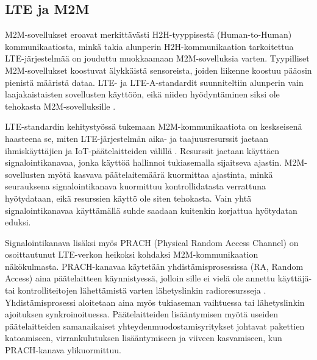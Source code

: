 \documentclass[finnish,12pt,a4paper,pdftex]{article}
\begin{document}
\subsection{LTE ja M2M}

M2M-sovellukset eroavat merkittävästi H2H-tyyppisestä (Human-to-Human) kommunikaatiosta, minkä takia alunperin H2H-kommunikaation tarkoitettua LTE-järjestelmää on jouduttu muokkaamaan M2M-sovelluksia varten. Tyypilliset M2M-sovellukset koostuvat älykkäistä sensoreista, joiden liikenne koostuu pääosin pienistä määristä dataa. LTE- ja LTE-A-standardit suunniteltiin alunperin vain laajakaistaisten sovellusten käyttöön, eikä niiden hyödyntäminen siksi ole tehokasta M2M-sovelluksille \cite{ghavimi2015m2m}.

LTE-standardin kehitystyössä tukemaan M2M-kommunikaatiota on keskseisenä haasteena se, miten LTE-järjestelmän aika- ja taajuusresurssit jaetaan ihmiskäyttäjien ja IoT-päätelaitteiden välillä \cite{ghavimi2015m2m}. Resurssit jaetaan käyttäen signalointikanavaa, jonka käyttöä hallinnoi tukiasemalla sijaitseva ajastin. M2M-sovellusten myötä kasvava päätelaitemäärä kuormittaa ajastinta, minkä seurauksena signalointikanava kuormittuu kontrollidatasta verrattuna hyötydataan, eikä resurssien käyttö ole siten tehokasta. Vain yhtä signalointikanavaa käyttämällä suhde saadaan kuitenkin korjattua hyötydatan eduksi.

Signalointikanava lisäksi myös PRACH (Physical Random Access Channel) on osoittautunut LTE-verkon heikoksi kohdaksi M2M-kommunikaation näkökulmasta. PRACH-kanavaa käytetään yhdistämisprosessissa (RA, Random Access) aina päätelaitteen käynnistyessä, jolloin sille ei vielä ole annettu käyttäjä- tai kontrolliteitojen lähettämistä varten lähetyslinkin radioresursseja \cite{ghavimi2015m2m}. Yhdistämisprosessi aloitetaan aina myös tukiaseman vaihtuessa tai lähetyslinkin ajoituksen synkroinoituessa. Päätelaitteiden lisääntymisen myötä useiden päätelaitteiden samanaikaiset yhteydenmuodostamisyritykset johtavat pakettien katoamiseen, virrankulutuksen lisääntymiseen ja viiveen kasvamiseen, kun PRACH-kanava ylikuormittuu.

\end{document}

